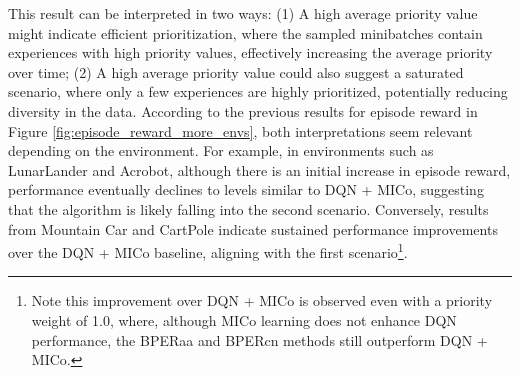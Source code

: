 This result can be interpreted in two ways: (1) A high average priority value might indicate efficient prioritization, where the sampled minibatches contain experiences with high priority values, effectively increasing the average priority over time; (2) A high average priority value could also suggest a saturated scenario, where only a few experiences are highly prioritized, potentially reducing diversity in the data. According to the previous results for episode reward in Figure \ref{fig:episode_reward_more_envs}, both interpretations seem relevant depending on the environment. For example, in environments such as LunarLander and Acrobot, although there is an initial increase in episode reward, performance eventually declines to levels similar to DQN + MICo, suggesting that the algorithm is likely falling into the second scenario. Conversely, results from Mountain Car and CartPole indicate sustained performance improvements over the DQN + MICo baseline, aligning with the first scenario\footnote{Note this improvement over DQN + MICo is observed even with a priority weight of 1.0, where, although MICo learning does not enhance DQN performance, the BPERaa and BPERcn methods still outperform DQN + MICo.}.

